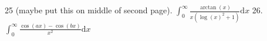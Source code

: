 \documentclass{article}
\newcommand{\dd}{\mathrm{d}}
\begin{document}
\begin{flushleft}
25 (maybe put this on middle of second page). $\int_0^{\infty} \frac{\arctan(x)}{x(\log(x)^2+1)} \dd x$ \newline  \newline \newline 
26. $\int_0^{\infty} \frac{\cos(ax)-\cos(bx)}{x^2} \dd x$ \newline  \newline \newline 



\end{flushleft}
\end{document}

